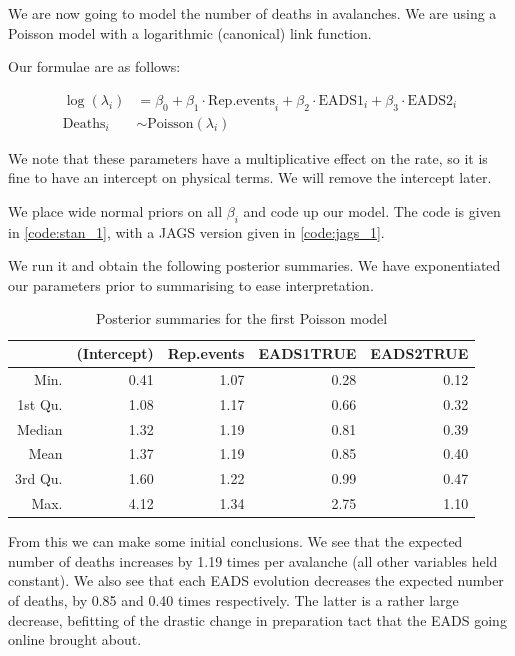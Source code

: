 \documentclass[10pt]{extarticle}
\begin{document}
We are now going to model the number of deaths in avalanches. We are using a Poisson model with a logarithmic (canonical) link function. 

Our formulae are as follows:

\begin{align*}
\log(\lambda_i) &= \beta_0 + \beta_1\cdot \mathrm{Rep.events}_i + \beta_2 \cdot \mathrm{EADS1}_i + \beta_3 \cdot \mathrm{EADS2}_i\\
\mathrm{Deaths}_i &\sim \mathrm{Poisson}(\lambda_i)
\end{align*}

We note that these parameters have a multiplicative effect on the rate, so it is fine to have an intercept on physical terms. We will remove the intercept later.

We place wide normal priors on all $\beta_i$ and code up our model. The code is given in \ref{code:stan_1}, with a JAGS version given in \ref{code:jags_1}. 

We run it and obtain the following posterior summaries. We have exponentiated our parameters prior to summarising to ease interpretation.

\begin{table}[ht]
	\centering
	\begin{tabular}{rrrrr}
		\hline
		& (Intercept) & Rep.events & EADS1TRUE & EADS2TRUE \\ 
		\hline
		Min. & 0.41 & 1.07 & 0.28 & 0.12 \\ 
		1st Qu. & 1.08 & 1.17 & 0.66 & 0.32 \\ 
		Median & 1.32 & 1.19 & 0.81 & 0.39 \\ 
		Mean & 1.37 & 1.19 & 0.85 & 0.40 \\ 
		3rd Qu. & 1.60 & 1.22 & 0.99 & 0.47 \\ 
		Max. & 4.12 & 1.34 & 2.75 & 1.10 \\ 
		\hline
	\end{tabular}
\caption{Posterior summaries for the first Poisson model}
\label{tab:postsum_po}
\end{table}

From this we can make some initial conclusions. We see that the expected number of deaths increases by 1.19 times per avalanche (all other variables held constant). We also see that each EADS evolution decreases the expected number of deaths, by 0.85 and 0.40 times respectively. The latter is a rather large decrease, befitting of the drastic change in preparation tact that the EADS going online brought about.
\end{document}
